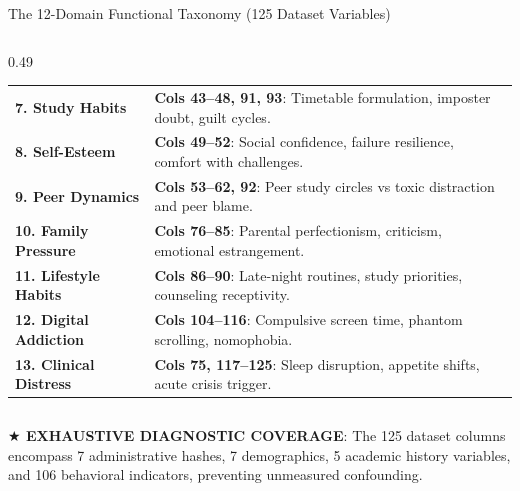 \documentclass{beamer}
\begin{document}
\begin{frame}[t]{The 12-Domain Functional Taxonomy (125 Dataset Variables)}
\begin{columns}[T]
\begin{column}{0.49\textwidth}
\begin{tcolorbox}
\begin{tabularx}{\linewidth}{@{}l X@{}}
          \midrule
          \rowcolor{BlueLight} \textbf{7. Study Habits} & \textbf{Cols 43--48, 91, 93}: Timetable formulation, imposter doubt, guilt cycles. \\
          \rowcolor{CanvasBG} \textbf{8. Self-Esteem} & \textbf{Cols 49--52}: Social confidence, failure resilience, comfort with challenges. \\
          \rowcolor{BlueLight} \textbf{9. Peer Dynamics} & \textbf{Cols 53--62, 92}: Peer study circles vs toxic distraction and peer blame. \\
          \rowcolor{CanvasBG} \textbf{10. Family Pressure} & \textbf{Cols 76--85}: Parental perfectionism, criticism, emotional estrangement. \\
          \rowcolor{BlueLight} \textbf{11. Lifestyle Habits} & \textbf{Cols 86--90}: Late-night routines, study priorities, counseling receptivity. \\
          \rowcolor{CanvasBG} \textbf{12. Digital Addiction} & \textbf{Cols 104--116}: Compulsive screen time, phantom scrolling, nomophobia. \\
          \rowcolor{GoldBG} \textbf{13. Clinical Distress} & \textbf{Cols 75, 117--125}: Sleep disruption, appetite shifts, acute crisis trigger. \\
          \bottomrule
        \end{tabularx}
      \end{tcolorbox}
    \end{column}
  \end{columns}
  \vspace{1mm}

  \begin{takeawaybanner}
    \fontsize{5.0pt}{6.0pt}\selectfont
    \textbf{\color{GoldPill}$\bigstar$ EXHAUSTIVE DIAGNOSTIC COVERAGE}: The 125 dataset columns encompass 7 administrative hashes, 7 demographics, 5 academic history variables, and 106 behavioral indicators, preventing unmeasured confounding.
  \end{takeawaybanner}
\end{frame}
\end{document}
